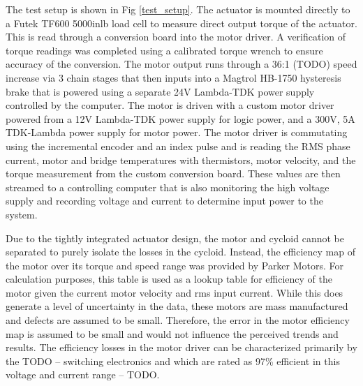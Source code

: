 \documentclass[letterpaper, 10 pt, conference]{ieeeconf}  %
\begin{document}
The test setup is shown in Fig \ref{test_setup}. The actuator is mounted directly to a Futek TF600 5000inlb load cell to measure direct output torque of the actuator. This is read through a conversion board into the motor driver. A verification of torque readings was completed using a calibrated torque wrench to ensure accuracy of the conversion. The motor output runs through a 36:1 (TODO) speed increase via 3 chain stages that then inputs into a Magtrol HB-1750 hysteresis brake that is powered using a separate 24V Lambda-TDK power supply controlled by the computer. The motor is driven with a custom motor driver powered from a 12V Lambda-TDK power supply for logic power, and a 300V, 5A TDK-Lambda power supply for motor power. The motor driver is commutating using the incremental encoder and an index pulse and is reading the RMS phase current, motor and bridge temperatures with thermistors, motor velocity, and the torque measurement from the custom conversion board. These values are then streamed to a controlling computer that is also monitoring the high voltage supply and recording voltage and current to determine input power to the system. 

Due to the tightly integrated actuator design, the motor and cycloid cannot be separated to purely isolate the losses in the cycloid. Instead, the efficiency map of the motor over its torque and speed range was provided by Parker Motors. For calculation purposes, this table is used as a lookup table for efficiency of the motor given the current motor velocity and rms input current. While this does generate a level of uncertainty in the data, these motors are mass manufactured and defects are assumed to be small. Therefore, the error in the motor efficiency map is assumed to be small and would not influence the perceived trends and results. The efficiency losses in the motor driver can be characterized primarily by the TODO -- switching electronics and which are rated as 97\% efficient in this voltage and current range -- TODO. 
\end{document}
